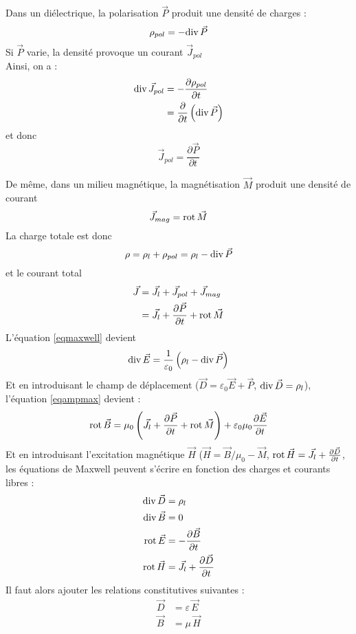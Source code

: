 \documentclass[11pt, a4paper, openany]{book}
\begin{document}
		Dans un diélectrique, la polarisation $\vec P$ produit une densité de charges :\begin{equation}
		\rho_{pol}=-\divv\vec P
		\end{equation}
		Si $\vec P$ varie, la densité provoque un courant $\vec J_{pol}$\\
		Ainsi, on a :\begin{align}
		\divv\vec J_{pol} & =-\frac{\partial \rho_{pol}}{\partial t}\\
		& =\frac{\partial}{\partial t}\left(\divv\vec P\right)
		\end{align}
		et donc\begin{equation}
		\vec J_{pol}=\frac{\partial\vec P}{\partial t}
		\end{equation}
		
		De même, dans un milieu magnétique, la magnétisation $\vec M$ produit une densité de courant \begin{equation}
		\vec J_{mag}=\rot\vec M
		\end{equation}
		La charge totale est donc \begin{equation}
		\rho=\rho_l+\rho_{pol}=\rho_l-\divv\vec P
		\end{equation}
		et le courant total \begin{align}
		\vec J & =\vec J_l+\vec J_{pol}+\vec J_{mag}\\
		& =\vec J_l+\frac{\partial\vec P}{\partial t}+\rot\vec M
		\end{align}
		L'équation \eqref{eqmaxwell} devient \begin{equation}
		\divv\vec E=\frac{1}{\varepsilon_0}\left(\rho_l-\divv\vec P\right)
		\end{equation}
		Et en introduisant le champ de déplacement ($\vec D=\varepsilon_0\vec E+\vec P$, $\divv\vec D=\rho_l$), l'équation \eqref{eqampmax} devient : \begin{equation}
		\rot\vec B=\mu_0\left(\vec J_l+\frac{\partial \vec P}{\partial t}+\rot\vec M\right)+\varepsilon_0\mu_0\frac{\partial\vec E}{\partial t}
		\end{equation}
		Et en introduisant l'excitation magnétique $\vec H$ ($\vec H=\vec B/\mu_0-\vec M$, $\rot\vec H=\vec J_l+\frac{\partial\vec D}{\partial t}$, les équations de Maxwell peuvent s'écrire en fonction des charges et courants libres : \begin{align}
		\divv\vec D & =\rho_l\\
		\divv\vec B & =0\\
		\rot\vec E & =-\frac{\partial\vec B}{\partial t}\\
		\rot\vec H & =\vec J_l+\frac{\partial\vec D}{\partial t}
		\end{align}
		Il faut alors ajouter les relations constitutives suivantes :\begin{align}
		\vec D & =\varepsilon\,\vec E\\
		\vec B & = \mu\,\vec H
		\end{align}
\end{document}
